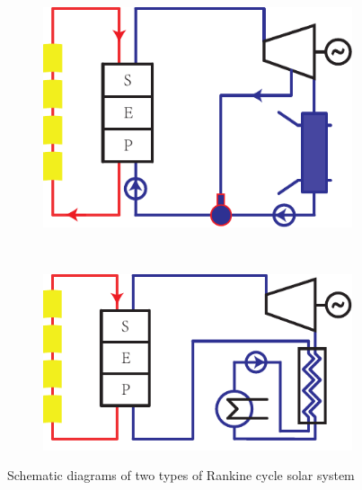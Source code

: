 \noindent \begin{figure}[htbp]
\centering
	\begin{subfigure}[b]{0.4\columnwidth}
	\includegraphics[width = \columnwidth]{fig/TypicalSteamRankineSolarSystem}
	\caption{}\label{fig:TypicalSteamRankineSolarSystem}
	\end{subfigure}
	~
\begin{subfigure}[b]{0.4\columnwidth}
	\includegraphics[width = \columnwidth]{fig/TypicalOrganicRankineSolarSystem}
	\caption{}\label{fig:TypicalOrganicRankineSolarSystem}
	\end{subfigure}
	\caption{Schematic diagrams of two types of Rankine cycle solar system}
	\label{fig:TwoTypesOfRankineCycle}
\end{figure}


